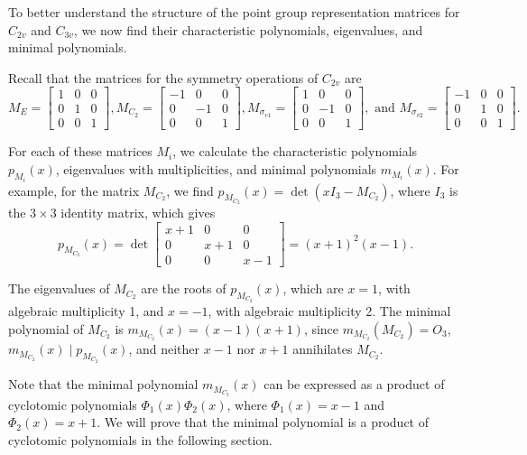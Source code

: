 \documentclass{article}
\begin{document}
    To better understand the structure of the point group representation matrices for $C_{2v}$ and $C_{3v}$, we now find their characteristic polynomials, eigenvalues, and minimal polynomials.

    Recall that the matrices for the symmetry operations of $C_{2v}$ are \[M_E=\begin{bmatrix}1&0&0\\0&1&0\\0&0&1\end{bmatrix}, M_{C_2}=\begin{bmatrix}-1&0&0\\0&-1&0\\0&0&1\end{bmatrix}, M_{\sigma_{v1}}=\begin{bmatrix}1&0&0\\0&-1&0\\0&0&1\end{bmatrix}, \text{ and } M_{\sigma_{v2}}=\begin{bmatrix}-1&0&0\\0&1&0\\0&0&1\end{bmatrix}.\]

    \pagebreak

    For each of these matrices $M_i$, we calculate the characteristic polynomials $p_{M_i}(x)$, eigenvalues with multiplicities, and minimal polynomials $m_{M_i}(x)$. For example, for the matrix $M_{C_2}$, we find $p_{M_{C_2}}(x)=\det(xI_3-M_{C_2})$, where $I_3$ is the $3\times 3$ identity matrix, which gives
    \[p_{M_{C_2}}(x)=\det\begin{bmatrix}x+1&0&0\\0&x+1&0\\0&0&x-1\end{bmatrix}=(x+1)^2(x-1).\]
    
    The eigenvalues of $M_{C_2}$ are the roots of $p_{M_{C_2}}(x)$, which are $x=1$, with algebraic multiplicity 1, and $x=-1$, with algebraic multiplicity 2. The minimal polynomial of $M_{C_2}$ is $m_{M_{C_2}}(x)=(x-1)(x+1)$, since $m_{M_{C_2}}(M_{C_2})=O_3$, $m_{M_{C_2}}(x)\mid p_{M_{C_2}}(x)$, and neither $x-1$ nor $x+1$ annihilates $M_{C_2}$.
    
    Note that the minimal polynomial $m_{M_{C_2}}(x)$ can be expressed as a product of cyclotomic polynomials $\Phi_1(x)\Phi_2(x)$, where $\Phi_1(x)=x-1$ and $\Phi_2(x)=x+1$. We will prove that the minimal polynomial is a product of cyclotomic polynomials in the following section.
\end{document}
